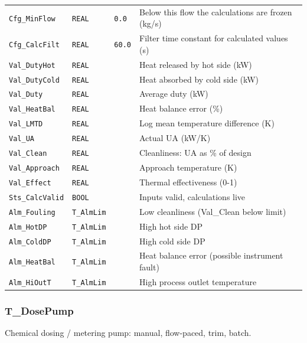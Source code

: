 {\begin{longtable}{@{}>{\raggedright\arraybackslash}p{3.4cm}>{\raggedright\arraybackslash}p{3.3cm}>{\raggedright\arraybackslash}p{1.3cm}>{\raggedright\arraybackslash}p{6.4cm}@{}}
\texttt{Cfg\_MinFlow} & \texttt{REAL} & \texttt{0.0} & Below this flow the calculations are frozen (kg/\allowbreak{}s) \\
\texttt{Cfg\_CalcFilt} & \texttt{REAL} & \texttt{60.0} & Filter time constant for calculated values (s) \\
\texttt{Val\_DutyHot} & \texttt{REAL} &  & Heat released by hot side (kW) \\
\texttt{Val\_DutyCold} & \texttt{REAL} &  & Heat absorbed by cold side (kW) \\
\texttt{Val\_Duty} & \texttt{REAL} &  & Average duty (kW) \\
\texttt{Val\_HeatBal} & \texttt{REAL} &  & Heat balance error (\%) \\
\texttt{Val\_LMTD} & \texttt{REAL} &  & Log mean temperature difference (K) \\
\texttt{Val\_UA} & \texttt{REAL} &  & Actual UA (kW/\allowbreak{}K) \\
\texttt{Val\_Clean} & \texttt{REAL} &  & Cleanliness: UA as \% of design \\
\texttt{Val\_Approach} & \texttt{REAL} &  & Approach temperature (K) \\
\texttt{Val\_Effect} & \texttt{REAL} &  & Thermal effectiveness (0-1) \\
\texttt{Sts\_CalcValid} & \texttt{BOOL} &  & Inputs valid, calculations live \\
\texttt{Alm\_Fouling} & \texttt{T\_AlmLim} &  & Low cleanliness (Val\_Clean below limit) \\
\texttt{Alm\_HotDP} & \texttt{T\_AlmLim} &  & High hot side DP \\
\texttt{Alm\_ColdDP} & \texttt{T\_AlmLim} &  & High cold side DP \\
\texttt{Alm\_HeatBal} & \texttt{T\_AlmLim} &  & Heat balance error (possible instrument fault) \\
\texttt{Alm\_HiOutT} & \texttt{T\_AlmLim} &  & High process outlet temperature \\
\bottomrule
\end{longtable}
}
\subsubsection*{T\_DosePump}
\label{app:pclib:tdosepump}
Chemical dosing /\allowbreak{} metering pump: manual, flow-paced, trim, batch.

